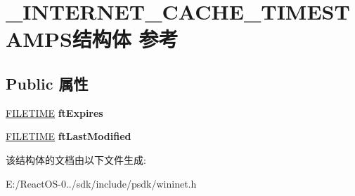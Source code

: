 \hypertarget{struct___i_n_t_e_r_n_e_t___c_a_c_h_e___t_i_m_e_s_t_a_m_p_s}{}\section{\+\_\+\+I\+N\+T\+E\+R\+N\+E\+T\+\_\+\+C\+A\+C\+H\+E\+\_\+\+T\+I\+M\+E\+S\+T\+A\+M\+P\+S结构体 参考}
\label{struct___i_n_t_e_r_n_e_t___c_a_c_h_e___t_i_m_e_s_t_a_m_p_s}
\subsection*{Public 属性}
\begin{DoxyCompactItemize}
\item 
\mbox{\label{struct___i_n_t_e_r_n_e_t___c_a_c_h_e___t_i_m_e_s_t_a_m_p_s_a5e190083a817ac0f93c3e8ed732b2f8d}} 
\hyperlink{struct___f_i_l_e_t_i_m_e}{F\+I\+L\+E\+T\+I\+ME} {\bfseries ft\+Expires}
\item 
\mbox{\label{struct___i_n_t_e_r_n_e_t___c_a_c_h_e___t_i_m_e_s_t_a_m_p_s_abcf460e89796fc86d6f2214b033cfcd4}} 
\hyperlink{struct___f_i_l_e_t_i_m_e}{F\+I\+L\+E\+T\+I\+ME} {\bfseries ft\+Last\+Modified}
\end{DoxyCompactItemize}


该结构体的文档由以下文件生成\+:\begin{DoxyCompactItemize}
\item 
E\+:/\+React\+O\+S-\/0../sdk/include/psdk/wininet.\+h\end{DoxyCompactItemize}
